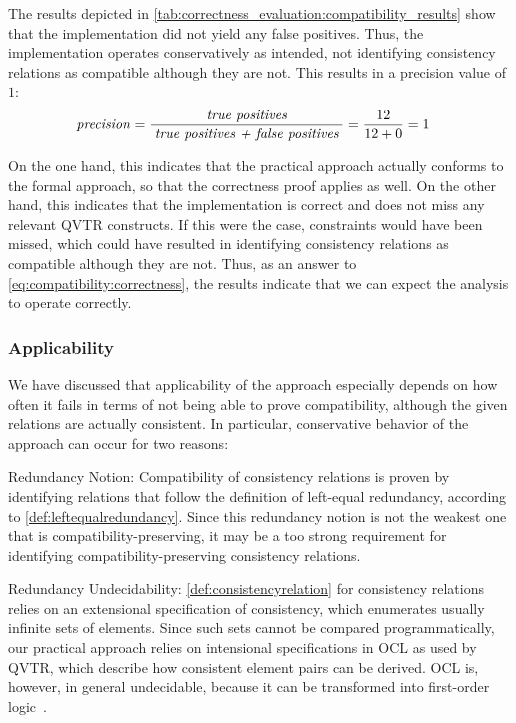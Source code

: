 The results depicted in \autoref{tab:correctness_evaluation:compatibility_results} show that the implementation did not yield any false positives.
Thus, the implementation operates conservatively as intended, not identifying consistency relations as compatible although they are not.
This results in a precision value of $1$:
\begin{align*}
    &
    \mathit{precision} = \frac{\; \textit{true positives} \;}{\; \textit{true positives + false positives} \;} = \frac{12}{12+0} = 1
\end{align*}

On the one hand, this indicates that the practical approach actually conforms to the formal approach, so that the correctness proof applies as well.
On the other hand, this indicates that the implementation is correct and does not miss any relevant \gls{QVTR} constructs.
If this were the case, constraints would have been missed, which could have resulted in identifying consistency relations as compatible although they are not.
Thus, as an answer to \autoref{eq:compatibility:correctness}, the results indicate that we can expect the analysis to operate correctly.


\subsubsection{Applicability}

We have discussed that applicability of the approach especially depends on how often it fails in terms of not being able to prove compatibility, although the given relations are actually consistent.
In particular, conservative behavior of the approach can occur for two reasons:
\begin{properdescription}
    \item[Redundancy Notion:] Compatibility of consistency relations is proven by identifying relations that follow the definition of left-equal redundancy, according to \autoref{def:leftequalredundancy}. Since this redundancy notion is not the weakest one that is compatibility-preserving, it may be a too strong requirement for identifying compatibility-preserving consistency relations.
    \item[Redundancy Undecidability:] \autoref{def:consistencyrelation} for consistency relations relies on an extensional specification of consistency, which enumerates usually infinite sets of elements.
    Since such sets cannot be compared programmatically, our practical approach relies on intensional specifications in \gls{OCL} as used by \gls{QVTR}, which describe how consistent element pairs can be derived.
    \gls{OCL} is, however, in general undecidable, because it can be transformed into first-order logic~\cite{beckert2002ocltranslation}.
\end{properdescription}

